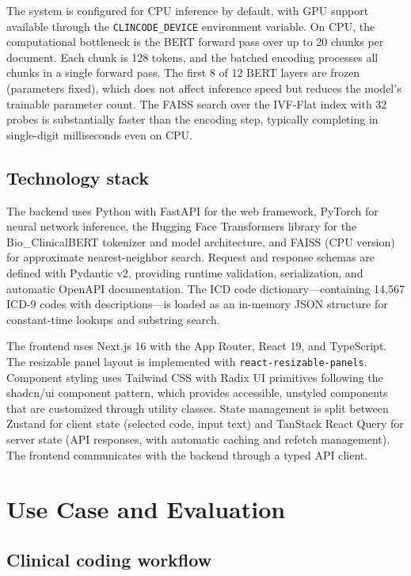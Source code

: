 \documentclass[conference]{IEEEtran}
\begin{document}
The system is configured for CPU inference by default, with GPU support available through the \texttt{CLINCODE\_DEVICE} environment variable. On CPU, the computational bottleneck is the BERT forward pass over up to 20 chunks per document. Each chunk is 128 tokens, and the batched encoding processes all chunks in a single forward pass. The first 8 of 12 BERT layers are frozen (parameters fixed), which does not affect inference speed but reduces the model's trainable parameter count. The FAISS search over the IVF-Flat index with 32 probes is substantially faster than the encoding step, typically completing in single-digit milliseconds even on CPU.

\subsection{Technology stack}

The backend uses Python with FastAPI for the web framework, PyTorch for neural network inference, the Hugging Face Transformers library for the Bio\_ClinicalBERT tokenizer and model architecture, and FAISS (CPU version) for approximate nearest-neighbor search. Request and response schemas are defined with Pydantic v2, providing runtime validation, serialization, and automatic OpenAPI documentation. The ICD code dictionary---containing 14,567 ICD-9 codes with descriptions---is loaded as an in-memory JSON structure for constant-time lookups and substring search.

The frontend uses Next.js 16 with the App Router, React 19, and TypeScript. The resizable panel layout is implemented with \texttt{react-resizable-panels}. Component styling uses Tailwind CSS with Radix UI primitives following the shadcn/ui component pattern, which provides accessible, unstyled components that are customized through utility classes. State management is split between Zustand for client state (selected code, input text) and TanStack React Query for server state (API responses, with automatic caching and refetch management). The frontend communicates with the backend through a typed API client.

\section{Use Case and Evaluation}

\subsection{Clinical coding workflow}
\end{document}
